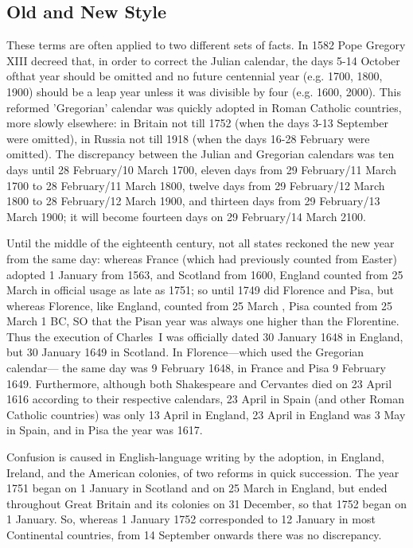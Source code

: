 \subsection{Old and New Style}

These terms are often applied to two different sets of facts. In 1582 Pope
Gregory XIII decreed that, in order to correct the Julian calendar, the
days 5-14 October ofthat year should be omitted and no future centennial
year (e.g. 1700, 1800, 1900) should be a leap year unless it was
divisible by four (e.g. 1600, 2000). This reformed 'Gregorian' calendar
was quickly adopted in Roman Catholic countries, more slowly elsewhere:
in Britain not till 1752 (when the days 3-13 September were
omitted), in Russia not till 1918 (when the days 16-28 February were
omitted). The discrepancy between the Julian and Gregorian calendars
was ten days until 28 February/10 March 1700, eleven days from 29
February/11 March 1700 to 28 February/11 March 1800, twelve days
from 29 February/12 March 1800 to 28 February/12 March 1900, and
thirteen days from 29 February/13 March 1900; it will become fourteen
days on 29 February/14 March 2100.

Until the middle of the eighteenth century, not all states reckoned the
new year from the same day: whereas France (which had previously
counted from Easter) adopted 1 January from 1563, and Scotland from
1600, England counted from 25 March in official usage as late as 1751; so
until 1749 did Florence and Pisa, but whereas Florence, like England,
counted from 25 March , Pisa counted from 25 March 1 BC, SO that the
Pisan year was always one higher than the Florentine. Thus the execution
of Charles~I was officially dated 30 January 1648 in England, but 30
January 1649 in Scotland. In Florence---which used the Gregorian calendar---
the same day was 9 February 1648, in France and Pisa 9 February
1649. Furthermore, although both Shakespeare and Cervantes died on 23
April 1616 according to their respective calendars, 23 April in Spain (and
other Roman Catholic countries) was only 13 April in England, 23 April in
England was 3 May in Spain, and in Pisa the year was 1617.

Confusion is caused in English-language writing by the adoption, in
England, Ireland, and the American colonies, of two reforms in quick
succession. The year 1751 began on 1 January in Scotland and on 25
March in England, but ended throughout Great Britain and its colonies
on 31 December, so that 1752 began on 1 January. So, whereas 1 January
1752 corresponded to 12 January in most Continental countries, from 14
September onwards there was no discrepancy.

